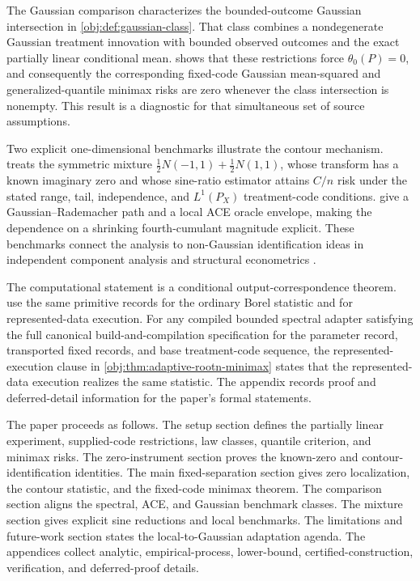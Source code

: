 \documentclass[11pt]{article}
\begin{document}
The Gaussian comparison characterizes the bounded-outcome Gaussian intersection in \cref{obj:def:gaussian-class}. That class combines a nondegenerate Gaussian treatment innovation with bounded observed outcomes and the exact partially linear conditional mean.  shows that these restrictions force \(\theta_0(P)=0\), and consequently the corresponding fixed-code Gaussian mean-squared and generalized-quantile minimax risks are zero whenever the class intersection is nonempty. This result is a diagnostic for that simultaneous set of source assumptions.

Two explicit one-dimensional benchmarks illustrate the contour mechanism.  treats the symmetric mixture \(\frac12N(-1,1)+\frac12N(1,1)\), whose transform has a known imaginary zero and whose sine-ratio estimator attains \(C/n\) risk under the stated range, tail, independence, and \(L^1(P_X)\) treatment-code conditions.  give a Gaussian--Rademacher path and a local ACE oracle envelope, making the dependence on a shrinking fourth-cumulant magnitude explicit. These benchmarks connect the analysis to non-Gaussian identification ideas in independent component analysis and structural econometrics \citep{Comon1994,HyvarinenOja1997,HyvarinenKarhunenOja2001,LanneMeitzSaikkonen2017,LeeMesters2024,HoeschLeeMesters2024,ReizingerEtAl2025}.

The computational statement is a conditional output-correspondence theorem.  use the same primitive records for the ordinary Borel statistic and for represented-data execution. For any compiled bounded spectral adapter satisfying the full canonical build-and-compilation specification for the parameter record, transported fixed records, and base treatment-code sequence, the represented-execution clause in \cref{obj:thm:adaptive-rootn-minimax} states that the represented-data execution realizes the same statistic. The appendix records proof and deferred-detail information for the paper's formal statements.

The paper proceeds as follows. The setup section defines the partially linear experiment, supplied-code restrictions, law classes, quantile criterion, and minimax risks. The zero-instrument section proves the known-zero and contour-identification identities. The main fixed-separation section gives zero localization, the contour statistic, and the fixed-code minimax theorem. The comparison section aligns the spectral, ACE, and Gaussian benchmark classes. The mixture section gives explicit sine reductions and local benchmarks. The limitations and future-work section states the local-to-Gaussian adaptation agenda. The appendices collect analytic, empirical-process, lower-bound, certified-construction, verification, and deferred-proof details.
\end{document}
